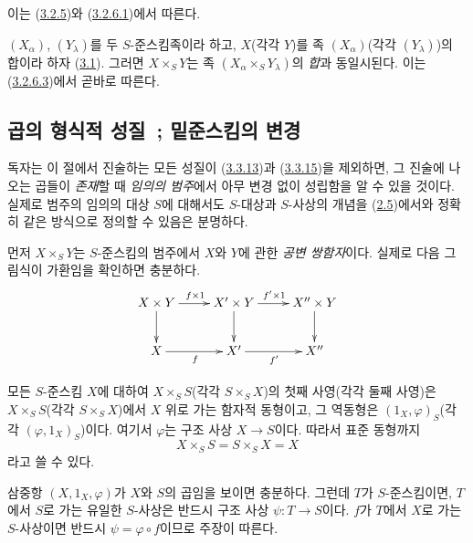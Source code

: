 이는 (\hyperref[I.3.2.5-ko]{3.2.5})와
(\hyperref[I.3.2.6.1-ko]{3.2.6.1})에서 따른다.

\begin{env}[3.2.8]
\label{I.3.2.8-ko}
$(X_\alpha)$, $(Y_\lambda)$를 두 $S$-준스킴족이라 하고, $X$(각각
$Y$)를 족 $(X_\alpha)$(각각 $(Y_\lambda)$)의 합이라 하자
(\hyperref[subsection:I.3.1-ko]{3.1}). 그러면 $X\times_S Y$는 족
$(X_\alpha\times_S Y_\lambda)$의 \emph{합}과 동일시된다. 이는
(\hyperref[I.3.2.6.3-ko]{3.2.6.3})에서 곧바로 따른다.
\end{env}

\subsection{곱의 형식적 성질~; 밑준스킴의 변경}
\label{subsection:I.3.3-ko}

\begin{env}[3.3.1]
\label{I.3.3.1-ko}
독자는 이 절에서 진술하는 모든 성질이
(\hyperref[I.3.3.13-ko]{3.3.13})과
(\hyperref[I.3.3.15-ko]{3.3.15})을 제외하면, 그 진술에 나오는
곱들이 \emph{존재}할 때 \emph{임의의 범주}에서 아무 변경 없이
성립함을 알 수 있을 것이다. 실제로 범주의 임의의 대상 $S$에
대해서도 $S$-대상과 $S$-사상의 개념을
(\hyperref[subsection:I.2.5-ko]{2.5})에서와 정확히 같은 방식으로
정의할 수 있음은 분명하다.
\end{env}

\begin{env}[3.3.2]
\label{I.3.3.2-ko}
먼저 $X\times_S Y$는 $S$-준스킴의 범주에서 $X$와 $Y$에 관한
\emph{공변 쌍함자}이다. 실제로 다음 그림식이 가환임을 확인하면
충분하다.
\[
  \xymatrix{
    X\times Y\ar[r]^{f\times 1}\ar[d] &
    X'\times Y\ar[r]^{f'\times 1}\ar[d] &
    X''\times Y\ar[d]\\
    X\ar[r]_f & X'\ar[r]_{f'} & X''
  }
\]
\end{env}

\begin{proposition}[3.3.3]
\label{I.3.3.3-ko}
모든 $S$-준스킴 $X$에 대하여 $X\times_S S$(각각 $S\times_S X$)의
첫째 사영(각각 둘째 사영)은 $X\times_S S$(각각 $S\times_S X$)에서
$X$ 위로 가는 함자적 동형이고, 그 역동형은
$(1_X,\varphi)_S$(각각 $(\varphi,1_X)_S$)이다. 여기서 $\varphi$는
구조 사상 $X\to S$이다. 따라서 표준 동형까지
\[
  X\times_S S=S\times_S X=X
\]
라고 쓸 수 있다.
\end{proposition}

삼중항 $(X,1_X,\varphi)$가 $X$와 $S$의 곱임을 보이면 충분하다.
그런데 $T$가 $S$-준스킴이면, $T$에서 $S$로 가는 유일한 $S$-사상은
반드시 구조 사상 $\psi:T\to S$이다. $f$가 $T$에서 $X$로 가는
$S$-사상이면 반드시 $\psi=\varphi\circ f$이므로 주장이 따른다.

